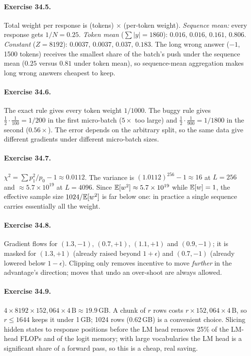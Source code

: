 \paragraph{Exercise 34.5.} Total weight per response is (tokens) $\times$ (per-token weight).
\emph{Sequence mean:} every response gets $1/N=0.25$. \emph{Token mean} ($\sum|y|=1860$): $0.016,\,0.016,\,0.161,\,0.806$.
\emph{Constant} ($Z=8192$): $0.0037,\,0.0037,\,0.037,\,0.183$. The long wrong answer
($-1$, 1500 tokens) receives the smallest share of the batch's push under the sequence mean
($0.25$ versus $0.81$ under token mean), so sequence-mean aggregation makes long wrong answers
cheapest to keep.

\paragraph{Exercise 34.6.} The exact rule gives every token weight $1/1000$. The buggy rule gives
$\frac12\cdot\frac{1}{100}=1/200$ in the first micro-batch ($5\times$ too large) and
$\frac12\cdot\frac{1}{900}=1/1800$ in the second ($0.56\times$). The error depends on the
arbitrary split, so the same data give different gradients under different micro-batch sizes.

\paragraph{Exercise 34.7.} $\chi^2=\sum p_1^2/p_0-1\approx0.0112$. The variance is
$(1.0112)^{256}-1\approx16$ at $L=256$ and $\approx5.7\times10^{19}$ at $L=4096$. Since
$\mathbb{E}[w^2]\approx5.7\times10^{19}$ while $\mathbb{E}[w]=1$, the effective sample size $1024/\mathbb{E}[w^2]$ is
far below one: in practice a single sequence carries essentially all the weight.

\paragraph{Exercise 34.8.} Gradient flows for $(1.3,-1)$, $(0.7,+1)$, $(1.1,+1)$ and $(0.9,-1)$; it is
masked for $(1.3,+1)$ (already raised beyond $1+\epsilon$) and $(0.7,-1)$ (already lowered below
$1-\epsilon$). Clipping only removes incentive to move \emph{further} in the advantage's direction;
moves that undo an over-shoot are always allowed.

\paragraph{Exercise 34.9.} $4\times8192\times152{,}064\times4\,\text{B}\approx19.9$\,GB. A chunk of $r$
rows costs $r\times152{,}064\times4$\,B, so $r\le1644$ keeps it under 1\,GB; 1024 rows (0.62\,GB) is a
convenient choice. Slicing hidden states to response positions before the LM head removes
25\% of the LM-head FLOPs and of the logit memory; with large vocabularies the LM head is a
significant share of a forward pass, so this is a cheap, real saving.

